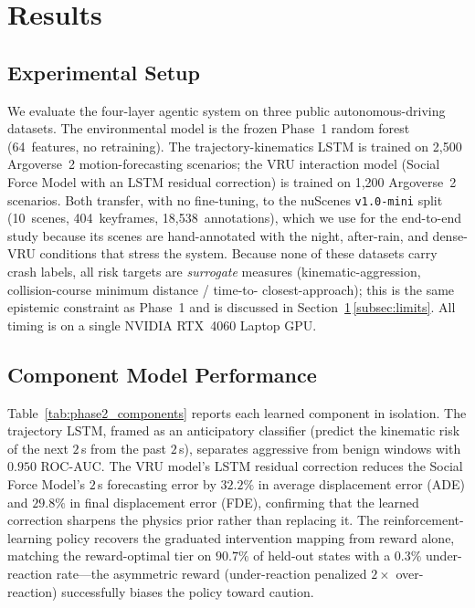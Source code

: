 \section{Results}
\label{sec:results}

\subsection{Experimental Setup}
We evaluate the four-layer agentic system on three public autonomous-driving
datasets. The environmental model is the frozen Phase~1 random forest
(64~features, no retraining). The trajectory-kinematics LSTM is trained on
2{,}500 Argoverse~2 motion-forecasting scenarios; the VRU interaction model
(Social Force Model with an LSTM residual correction) is trained on 1{,}200
Argoverse~2 scenarios. Both transfer, with no fine-tuning, to the nuScenes
\texttt{v1.0-mini} split (10~scenes, 404~keyframes, 18{,}538~annotations), which
we use for the end-to-end study because its scenes are hand-annotated with the
night, after-rain, and dense-VRU conditions that stress the system. Because none
of these datasets carry crash labels, all risk targets are \emph{surrogate}
measures (kinematic-aggression, collision-course minimum distance / time-to-
closest-approach); this is the same epistemic constraint as Phase~1 and is
discussed in Section~\ref{sec:results}\,\ref{subsec:limits}. All timing is on a
single NVIDIA RTX~4060 Laptop GPU.

\subsection{Component Model Performance}
Table~\ref{tab:phase2_components} reports each learned component in isolation.
The trajectory LSTM, framed as an anticipatory classifier (predict the kinematic
risk of the next $2$\,s from the past $2$\,s), separates aggressive from benign
windows with $0.950$ ROC-AUC. The VRU model's LSTM residual correction reduces
the Social Force Model's $2$\,s forecasting error by $32.2\%$ in average
displacement error (ADE) and $29.8\%$ in final displacement error (FDE),
confirming that the learned correction sharpens the physics prior rather than
replacing it. The reinforcement-learning policy recovers the graduated
intervention mapping from reward alone, matching the reward-optimal tier on
$90.7\%$ of held-out states with a $0.3\%$ under-reaction rate---the asymmetric
reward (under-reaction penalized $2\times$ over-reaction) successfully biases the
policy toward caution.

